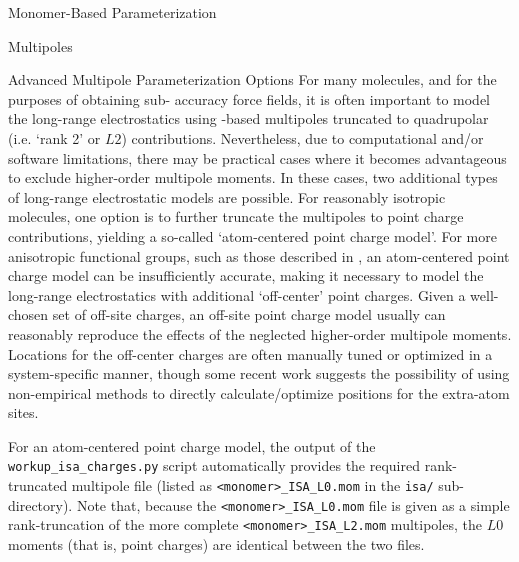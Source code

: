 \begin{section}{Monomer-Based Parameterization}
\begin{subsection}{Multipoles}
\begin{subsubsection}{Advanced Multipole Parameterization Options}
For many molecules, and for the purposes of obtaining sub-\kjmol{} accuracy
force fields, it is often important to model the long-range electrostatics
using \isa-based multipoles truncated to quadrupolar (i.e. `rank 2' or
$L2$)\cite{stone2013theory} contributions.
Nevertheless, due to computational and/or software limitations, there may be
practical cases where it becomes advantageous to exclude higher-order
multipole moments.\cite{Cardamone2014} In these cases, 
two additional types of long-range electrostatic models are possible. For
reasonably isotropic molecules, one option is to further truncate the \isa
multipoles to point charge contributions, yielding a so-called `atom-centered
point charge model'. For more anisotropic functional groups, such as those
described in , an atom-centered point charge model can be
insufficiently accurate, making it 
necessary to model the long-range electrostatics with additional 
`off-center' point charges. Given a well-chosen set of off-site charges, 
an off-site point charge model usually can reasonably reproduce the effects of the
neglected higher-order multipole moments.\cite{Dixon1997}
Locations for the off-center charges are often manually tuned or optimized
in a system-specific manner, though some recent work suggests the
possibility of using non-empirical methods to directly calculate/optimize 
positions for the extra-atom sites.\cite{Chaudret2013,Unke2017} 

For an atom-centered point charge model, the output of the
\verb|workup_isa_charges.py| script automatically provides the required
rank-truncated multipole file (listed as \verb|<monomer>_ISA_L0.mom| in the \verb|isa/|
sub-directory). Note that, because the \verb|<monomer>_ISA_L0.mom| file is given as a
simple rank-truncation of the more complete \verb|<monomer>_ISA_L2.mom|
multipoles, the $L0$ moments (that is, point charges) are identical between the two files.


\end{subsubsection}
\end{subsection}
\end{section}
